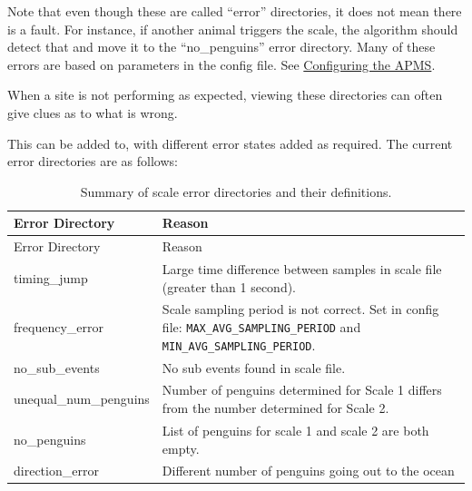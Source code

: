 \documentclass[
  letterpaper,
]{scrbook}
\begin{document}
Note that even though these are called ``error'' directories, it does
not mean there is a fault. For instance, if another animal triggers the
scale, the algorithm should detect that and move it to the
``no\_penguins'' error directory. Many of these errors are based on
parameters in the config file. See
\hyperref[Configuringux5cux2520theux5cux2520APMS]{Configuring the APMS}.

When a site is not performing as expected, viewing these directories can
often give clues as to what is wrong.

This can be added to, with different error states added as required. The
current error directories are as follows:

\begin{longtable}[]{@{}
  >{\raggedright\arraybackslash}p{}
  >{\raggedright\arraybackslash}p{}@{}}
\caption{Summary of scale error directories and their
definitions.}\label{tbl-error-directories}\tabularnewline
\toprule\noalign{}
\begin{minipage}[b]{\linewidth}\raggedright
Error Directory
\end{minipage} & \begin{minipage}[b]{\linewidth}\raggedright
Reason
\end{minipage} \\
\midrule\noalign{}
\endfirsthead
\toprule\noalign{}
\begin{minipage}[b]{\linewidth}\raggedright
Error Directory
\end{minipage} & \begin{minipage}[b]{\linewidth}\raggedright
Reason
\end{minipage} \\
\midrule\noalign{}
\endhead
\bottomrule\noalign{}
\endlastfoot
timing\_jump & Large time difference between samples in scale file
(greater than 1 second). \\
frequency\_error & Scale sampling period is not correct. Set in config
file: \texttt{MAX\_AVG\_SAMPLING\_PERIOD} and
\texttt{MIN\_AVG\_SAMPLING\_PERIOD}. \\
no\_sub\_events & No sub events found in scale file. \\
unequal\_num\_penguins & Number of penguins determined for Scale 1
differs from the number determined for Scale 2. \\
no\_penguins & List of penguins for scale 1 and scale 2 are both
empty. \\
direction\_error & Different number of penguins going out to the ocean

\end{longtable}
\end{document}
